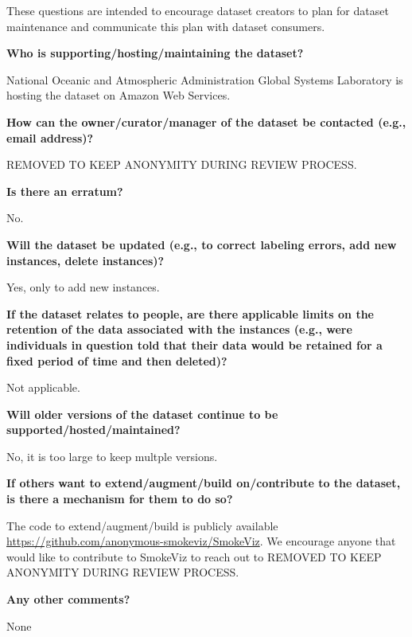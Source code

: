 \documentclass{article}
\begin{document}
These questions are intended to encourage dataset creators to plan for dataset maintenance and communicate this plan with dataset consumers.

\textbf{Who is supporting/hosting/maintaining the dataset?}

National Oceanic and Atmospheric Administration Global Systems Laboratory is hosting the dataset on Amazon Web Services.

\textbf{How can the owner/curator/manager of the dataset be contacted (e.g., email address)?}

REMOVED TO KEEP ANONYMITY DURING REVIEW PROCESS.

\textbf{Is there an erratum?}

No.

\textbf{Will the dataset be updated (e.g., to correct labeling errors, add new instances, delete instances)?}

Yes, only to add new instances.

\textbf{If the dataset relates to people, are there applicable limits on the retention of the data associated with the instances (e.g., were individuals in question told that their data would be retained for a fixed period of time and then deleted)?}

Not applicable.

\textbf{Will older versions of the dataset continue to be supported/hosted/maintained?}

No, it is too large to keep multple versions.

\textbf{If others want to extend/augment/build on/contribute to the dataset, is there a mechanism for them to do so?}

The code to extend/augment/build is publicly available \url{https://github.com/anonymous-smokeviz/SmokeViz}. We encourage anyone that would like to contribute to SmokeViz to reach out to REMOVED TO KEEP ANONYMITY DURING REVIEW PROCESS.

\textbf{Any other comments?}

None




\end{document}
